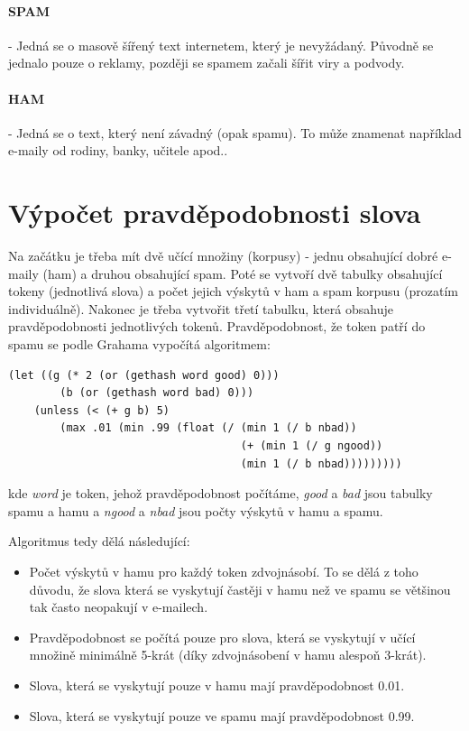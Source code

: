 \documentclass{semestralka}
\begin{document}
\paragraph{SPAM}
- Jedná se o masově šířený text internetem, který je nevyžádaný. Původně se jednalo pouze o reklamy, později se spamem začali šířit viry a podvody.

\paragraph{HAM}
- Jedná se o text, který není závadný (opak spamu). To může znamenat například e-maily od rodiny, banky, učitele apod..

\section{Výpočet pravděpodobnosti slova}
Na začátku je třeba mít dvě učící množiny (korpusy) - jednu obsahující dobré e-maily (ham) a druhou obsahující spam. Poté se vytvoří dvě tabulky obsahující tokeny (jednotlivá slova) a počet jejich výskytů v ham a spam korpusu (prozatím individuálně). Nakonec je třeba vytvořit třetí tabulku, která obsahuje pravděpodobnosti jednotlivých tokenů. Pravděpodobnost, že token patří do spamu se podle Grahama vypočítá algoritmem:

\begin{center}
\begin{verbatim}
(let ((g (* 2 (or (gethash word good) 0)))
        (b (or (gethash word bad) 0))) 
    (unless (< (+ g b) 5)
        (max .01 (min .99 (float (/ (min 1 (/ b nbad))
                                    (+ (min 1 (/ g ngood)) 
                                    (min 1 (/ b nbad)))))))))
\end{verbatim}
\end{center}

kde \textit{word} je token, jehož pravděpodobnost počítáme, \textit{good} a \textit{bad} jsou tabulky spamu a hamu a \textit{ngood} a \textit{nbad} jsou počty výskytů v hamu a spamu.

Algoritmus tedy dělá následující:

\begin{itemize}
\item
Počet výskytů v hamu pro každý token zdvojnásobí. To se dělá z toho důvodu, že slova která se vyskytují častěji v hamu než ve spamu se většinou tak často neopakují v e-mailech.
\item
Pravděpodobnost se počítá pouze pro slova, která se vyskytují v učící množině minimálně 5-krát (díky zdvojnásobení v hamu alespoň 3-krát).
\item
Slova, která se vyskytují pouze v hamu mají pravděpodobnost 0.01.
\item
Slova, která se vyskytují pouze ve spamu mají pravděpodobnost 0.99.

\end{itemize}
\end{document}
